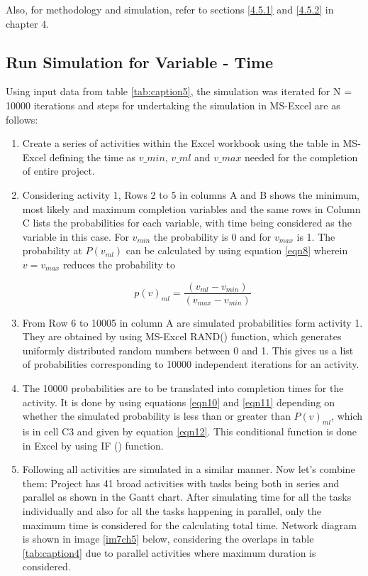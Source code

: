 Also, for methodology and simulation, refer to sections \ref{4.5.1} and \ref{4.5.2} in chapter 4. 
\clearpage


\subsection{Run Simulation for Variable - Time}
Using input data from table \ref{tab:caption5}, the simulation was iterated for N = 10000 iterations and steps for undertaking the simulation in MS-Excel are as follows:

\begin{enumerate}
	\item Create a series of activities within the Excel workbook \cite{Github} using the table in MS-Excel defining the time as $v\_min$, $v\_ml$ and $v\_max$ needed for the completion of entire project.
	
	\item Considering activity 1, Rows 2 to 5 in columns A and B shows the minimum, most likely and maximum completion variables and the same rows in Column C lists the probabilities for each variable, with time being considered as the variable in this case. For $v_ {min} $ the probability is 0 and for $v_ {max} $ is 1. 
	The probability at $P (v_ {ml}) $ can be calculated by using equation \ref{eqn8} wherein $v = v_ {max} $ reduces the probability to 
	
	\begin{equation}
	p(v)_{ml}  = \frac{(v_{ml} - v_{min})}{  (v_{max} - v_{min}) } 
	\label{eqn5.1}
	\end{equation}
	
	\item From Row 6 to 10005 in column A are simulated probabilities form activity 1. They are obtained by using MS-Excel RAND() function, which generates uniformly distributed random numbers between 0 and 1. This gives us a list of probabilities corresponding to 10000 independent iterations for an activity.
	
	\item The 10000 probabilities are to be translated into completion times for the activity. It is done by using equations \ref{eqn10} and \ref{eqn11} depending on whether the simulated probability is less than or greater than $P(v)_ {ml}$, which is in cell C3 and given by equation \ref{eqn12}. This conditional function is done in Excel by using IF () function.
	
	\item Following all activities are simulated in a similar manner. Now let's combine them: Project has 41 broad activities with tasks being both in series and parallel as shown in the Gantt chart. After simulating time for all the tasks individually and also for all the tasks happening in parallel, only the maximum time is considered for the calculating total time. Network diagram is shown in image \ref{im7ch5} below, considering the overlaps in table \ref{tab:caption4} due to parallel activities where maximum duration is considered. 
	

\end{enumerate}
